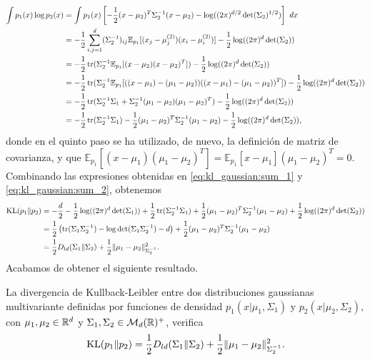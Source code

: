 \begin{equation} \label{eq:kl_gaussian:sum_2}
\begin{split}
    \int p_1(x)\log p_2(x) &= \int p_1(x) \left[-\frac{1}{2}(x-\mu_2)^T\Sigma_2^{-1}(x-\mu_2) - \log((2\pi)^{d/2}\det(\Sigma_2)^{1/2}) \right] \ dx\\
                  &= -\frac{1}{2} \sum_{i,j=1}^d(\Sigma_2^{-1})_{ij}\mathbb{E}_{p_1}[(x_j - \mu_j^{(2)})(x_i - \mu_i^{(2)})] - \frac{1}{2}\log((2\pi)^d\det(\Sigma_2)) \\
                  &= -\frac{1}{2} \operatorname{tr}(\Sigma_2^{-1}\mathbb{E}_{p_1}[(x-\mu_2)(x-\mu_2)^T])- \frac{1}{2}\log((2\pi)^d\det(\Sigma_2)) \\
                  &= -\frac{1}{2} \operatorname{tr}(\Sigma_2^{-1}\mathbb{E}_{p_1}[((x-\mu_1)-(\mu_1 - \mu_2))((x-\mu_1)-(\mu_1 - \mu_2))^T]) - \frac{1}{2}\log((2\pi)^d\det(\Sigma_2)) \\
                  &= -\frac{1}{2} \operatorname{tr}(\Sigma_2^{-1}\Sigma_1 + \Sigma_2^{-1}(\mu_1-\mu_2)(\mu_1-\mu_2)^T) - \frac{1}{2}\log((2\pi)^d\det(\Sigma_2)) \\
                  &= -\frac{1}{2} \operatorname{tr}(\Sigma_2^{-1}\Sigma_1) - \frac{1}{2}(\mu_1-\mu_2)^T\Sigma_2^{-1}(\mu_1 - \mu_2) - \frac{1}{2}\log((2\pi)^d\det(\Sigma_2)),
\end{split}
\end{equation}
donde en el quinto paso se ha utilizado, de nuevo, la definición de matriz de covarianza, y que $\mathbb{E}_{p_1}[(x-\mu_1)(\mu_1-\mu_2)^T] = \mathbb{E}_{p_1}[x-\mu_1](\mu_1-\mu_2)^T = 0$. Combinando las expresiones obtenidas en \ref{eq:kl_gaussian:sum_1} y \ref{eq:kl_gaussian:sum_2}, obtenemos
\begin{equation}
\begin{split}
 \operatorname{KL}(p_1\|p_2) &= -\frac{d}{2} -\frac{1}{2}\log((2\pi)^d\det(\Sigma_1))+\frac{1}{2} \operatorname{tr}(\Sigma_2^{-1}\Sigma_1)+\frac{1}{2}(\mu_1-\mu_2)^T\Sigma_2^{-1}(\mu_1 - \mu_2)+\frac{1}{2}\log((2\pi)^d\det(\Sigma_2))\\
    &= \frac{1}{2}\left( \operatorname{tr}(\Sigma_1\Sigma_2^{-1}) - \log\det(\Sigma_1\Sigma_2^{-1}) -d \right) + \frac{1}{2}(\mu_1-\mu_2)^T\Sigma_2^{-1}(\mu_1-\mu_2) \\
    &= \frac{1}{2}D_{ld}(\Sigma_1\|\Sigma_2) + \frac{1}{2}\|\mu_1-\mu_2\|_{\Sigma_2^{-1}}^2.
\end{split}
\end{equation}
Acabamos de obtener el siguiente resultado.
\begin{thm} \label{prop:caract_kl:1}
    La divergencia de Kullback-Leibler entre dos distribuciones gaussianas multivariante definidas por funciones de densidad $p_1(x|\mu_1,\Sigma_1)$ y $p_2(x|\mu_2,\Sigma_2)$, con $\mu_1,\mu_2 \in \mathbb{R}^d$ y $\Sigma_1,\Sigma_2 \in \mathcal{M}_d(\mathbb{R})^+$, verifica
    \[  \operatorname{KL}(p_1\|p_2) = \frac{1}{2}D_{ld}(\Sigma_1\|\Sigma_2) + \frac{1}{2}\|\mu_1-\mu_2\|_{\Sigma_2^{-1}}^2. \]
\end{thm}
